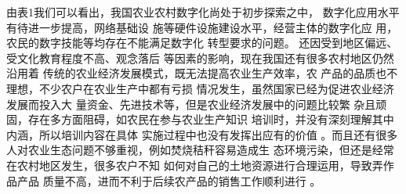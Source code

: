 \documentclass[a4paper]{article}
\begin{document}
由表1我们可以看出，我国农业农村数字化尚处于初步探索之中，
数字化应用水平有待进一步提高，网络基础设
施等硬件设施建设水平，经营主体的数字化应
用，农民的数字技能等均存在不能满足数字化
转型要求的问题。
还因受到地区偏远、受文化教育程度不高、观念落后
等因素的影响，现在我国还有很多农村地区仍然沿用着
传统的农业经济发展模式，既无法提高农业生产效率，农
产品的品质也不理想，不少农户在农业生产中都有亏损
情况发生，虽然国家已经为促进农业经济发展而投入大
量资金、先进技术等，但是农业经济发展中的问题比较繁
杂且顽固，存在多方面阻碍，如农民在参与农业生产知识
培训时，并没有深刻理解其中内涵，所以培训内容在具体
实施过程中也没有发挥出应有的价值
\cite{李素芳}。而且还有很多
人对农业生态问题不够重视，例如焚烧秸秆容易造成生
态环境污染，但还是经常在农村地区发生，很多农户不知
如何对自己的土地资源进行合理运用，导致弄作品产品
质量不高，进而不利于后续农产品的销售工作顺利进行
\cite{digital}。
\end{document}
